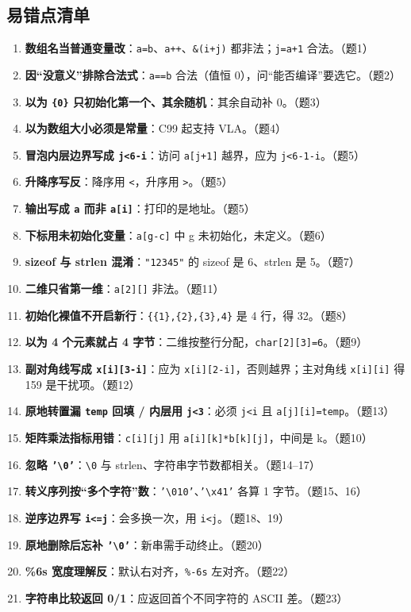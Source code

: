 \documentclass[UTF8,zihao=-4,a4paper]{ctexart}
\begin{document}
\subsection{易错点清单}
\begin{yicuodian}
\begin{enumerate}
  \item \textbf{数组名当普通变量改}：\texttt{a=b}、\texttt{a++}、\texttt{\&(i+j)} 都非法；\texttt{j=a+1} 合法。（题1）
  \item \textbf{因“没意义”排除合法式}：\texttt{a==b} 合法（值恒 0），问“能否编译”要选它。（题2）
  \item \textbf{以为 \texttt{\{0\}} 只初始化第一个、其余随机}：其余自动补 0。（题3）
  \item \textbf{以为数组大小必须是常量}：C99 起支持 VLA。（题4）
  \item \textbf{冒泡内层边界写成 \texttt{j<6-i}}：访问 \texttt{a[j+1]} 越界，应为 \texttt{j<6-1-i}。（题5）
  \item \textbf{升降序写反}：降序用 \texttt{<}，升序用 \texttt{>}。（题5）
  \item \textbf{输出写成 \texttt{a} 而非 \texttt{a[i]}}：打印的是地址。（题5）
  \item \textbf{下标用未初始化变量}：\texttt{a[g-c]} 中 g 未初始化，未定义。（题6）
  \item \textbf{sizeof 与 strlen 混淆}：\texttt{"12345"} 的 sizeof 是 6、strlen 是 5。（题7）
  \item \textbf{二维只省第一维}：\texttt{a[2][]} 非法。（题11）
  \item \textbf{初始化裸值不开启新行}：\texttt{\{\{1\},\{2\},\{3\},4\}} 是 4 行，得 32。（题8）
  \item \textbf{以为 4 个元素就占 4 字节}：二维按整行分配，\texttt{char[2][3]=6}。（题9）
  \item \textbf{副对角线写成 \texttt{x[i][3-i]}}：应为 \texttt{x[i][2-i]}，否则越界；主对角线 \texttt{x[i][i]} 得 159 是干扰项。（题12）
  \item \textbf{原地转置漏 \texttt{temp} 回填 / 内层用 \texttt{j<3}}：必须 \texttt{j<i} 且 \texttt{a[j][i]=temp}。（题13）
  \item \textbf{矩阵乘法指标用错}：\texttt{c[i][j]} 用 \texttt{a[i][k]*b[k][j]}，中间是 k。（题10）
  \item \textbf{忽略 \texttt{'\textbackslash 0'}}：\texttt{\textbackslash 0} 与 strlen、字符串字节数都相关。（题14–17）
  \item \textbf{转义序列按“多个字符”数}：\texttt{'\textbackslash 010'}、\texttt{'\textbackslash x41'} 各算 1 字节。（题15、16）
  \item \textbf{逆序边界写 \texttt{i<=j}}：会多换一次，用 \texttt{i<j}。（题18、19）
  \item \textbf{原地删除后忘补 \texttt{'\textbackslash 0'}}：新串需手动终止。（题20）
  \item \textbf{\%6s 宽度理解反}：默认右对齐，\texttt{\%-6s} 左对齐。（题22）
  \item \textbf{字符串比较返回 0/1}：应返回首个不同字符的 ASCII 差。（题23）
\end{enumerate}
\end{yicuodian}
\end{document}
